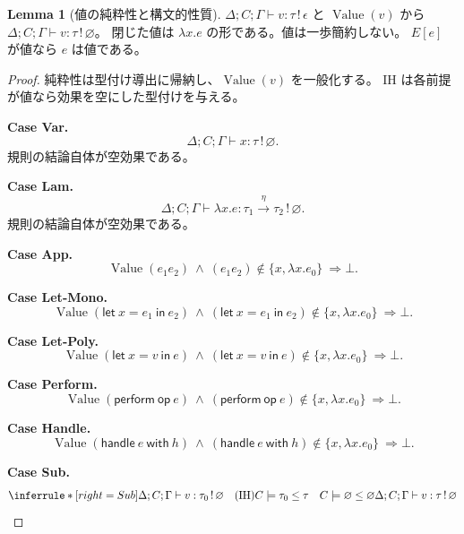 \documentclass[a4paper,11pt]{article}
\theoremstyle{definition}
\newtheorem{lemma}[definition]{Lemma}
\newenvironment{Case}[1]{\par\smallskip\noindent\textbf{Case #1.}\enspace\ignorespaces}{\par}
\newcommand{\op}{\mathsf{op}}
\newcommand{\emp}{\varnothing}
\newcommand{\arr}[3]{#1\xrightarrow{#2}#3}
\newcommand{\jj}[6]{#1;#2;#3\vdash #4:#5\,!\,#6}
\newcommand{\J}[3]{\jj{\Delta}{C}{\Gamma}{#1}{#2}{#3}}
\newcommand{\lete}[3]{\mathsf{let}\ #1=#2\ \mathsf{in}\ #3}
\newcommand{\perform}[2]{\mathsf{perform}\ #1\ #2}
\newcommand{\handle}[2]{\mathsf{handle}\ #1\ \mathsf{with}\ #2}
\newcommand{\Val}{\operatorname{Value}}
\newcommand{\proofspace}{\Needspace{16\baselineskip}}
\begin{document}
\proofspace
\begin{samepage}
\begin{lemma}[値の純粋性と構文的性質]\label{lem:values}
$\J v\tau\epsilon$ と $\Val(v)$ から $\J v\tau\emp$。
閉じた値は $\lambda x.e$ の形である。値は一歩簡約しない。
$E[e]$ が値なら $e$ は値である。
\end{lemma}
\end{samepage}
\nopagebreak[4]
\begin{proof}\leavevmode\label{proof:lem:values}
純粋性は型付け導出に帰納し、$\Val(v)$ を一般化する。
IH は各前提が値なら効果を空にした型付けを与える。

\begin{Case}{Var}
\[\jj\Delta C\Gamma{x}{\tau}\emp.\]
規則の結論自体が空効果である。
\end{Case}

\begin{Case}{Lam}
\[\jj\Delta C\Gamma{\lambda x.e}{\arr{\tau_1}\eta{\tau_2}}\emp.\]
規則の結論自体が空効果である。
\end{Case}

\begin{Case}{App}
\[\Val(e_1e_2)\ \land\ (e_1e_2)\notin\{x,\lambda x.e_0\}\ \Longrightarrow\bot.\]
\end{Case}

\begin{Case}{Let-Mono}
\[\Val(\lete x{e_1}{e_2})\ \land\ (\lete x{e_1}{e_2})\notin\{x,\lambda x.e_0\}\ \Longrightarrow\bot.\]
\end{Case}

\begin{Case}{Let-Poly}
\[\Val(\lete x v e)\ \land\ (\lete x v e)\notin\{x,\lambda x.e_0\}\ \Longrightarrow\bot.\]
\end{Case}

\begin{Case}{Perform}
\[\Val(\perform\op e)\ \land\ (\perform\op e)\notin\{x,\lambda x.e_0\}\ \Longrightarrow\bot.\]
\end{Case}

\begin{Case}{Handle}
\[\Val(\handle e h)\ \land\ (\handle e h)\notin\{x,\lambda x.e_0\}\ \Longrightarrow\bot.\]
\end{Case}

\begin{Case}{Sub}
\[
\inferrule*[right=Sub]{\J v{\tau_0}\emp\quad(\mathrm{IH})\\ C\models\tau_0\leq\tau\quad C\models\emp\leq\emp}{\J v\tau\emp}
\]
\end{Case}


\end{proof}
\end{document}
